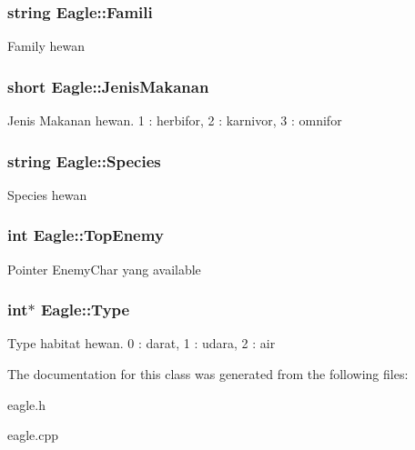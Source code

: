 \subsubsection[{\texorpdfstring{Famili}{Famili}}]{\setlength{\rightskip}{0pt plus 5cm}string Eagle\+::\+Famili\hspace{0.3cm}{\ttfamily [protected]}}\hypertarget{class_eagle_ade0d4181358630d065569538501f6132}{}\label{class_eagle_ade0d4181358630d065569538501f6132}
Family hewan 
\subsubsection[{\texorpdfstring{Jenis\+Makanan}{JenisMakanan}}]{\setlength{\rightskip}{0pt plus 5cm}short Eagle\+::\+Jenis\+Makanan\hspace{0.3cm}{\ttfamily [protected]}}\hypertarget{class_eagle_a55a9be317085d72e732d3ce8f30d5ba3}{}\label{class_eagle_a55a9be317085d72e732d3ce8f30d5ba3}
Jenis Makanan hewan. 1 \+: herbifor, 2 \+: karnivor, 3 \+: omnifor 
\subsubsection[{\texorpdfstring{Species}{Species}}]{\setlength{\rightskip}{0pt plus 5cm}string Eagle\+::\+Species\hspace{0.3cm}{\ttfamily [protected]}}\hypertarget{class_eagle_a61f705b57074941915461034802176f2}{}\label{class_eagle_a61f705b57074941915461034802176f2}
Species hewan 
\subsubsection[{\texorpdfstring{Top\+Enemy}{TopEnemy}}]{\setlength{\rightskip}{0pt plus 5cm}int Eagle\+::\+Top\+Enemy\hspace{0.3cm}{\ttfamily [protected]}}\hypertarget{class_eagle_a5b4809208017e8864727510d26436a0b}{}\label{class_eagle_a5b4809208017e8864727510d26436a0b}
Pointer Enemy\+Char yang available 
\subsubsection[{\texorpdfstring{Type}{Type}}]{\setlength{\rightskip}{0pt plus 5cm}int$\ast$ Eagle\+::\+Type\hspace{0.3cm}{\ttfamily [protected]}}\hypertarget{class_eagle_a95800352867fbd31040582cc79c18b82}{}\label{class_eagle_a95800352867fbd31040582cc79c18b82}
Type habitat hewan. 0 \+: darat, 1 \+: udara, 2 \+: air 

The documentation for this class was generated from the following files\+:\begin{DoxyCompactItemize}
\item 
eagle.\+h\item 
eagle.\+cpp\end{DoxyCompactItemize}
